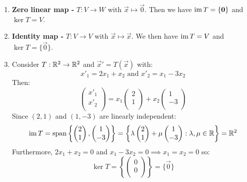 \documentclass[../main.tex]{subfiles}
\begin{document}
\begin{example}
  \begin{enumerate}
    \item \textbf{Zero linear map -} $T: V \to W$ with $\vec{x} \mapsto \vec{0}$.
      Then we have $\operatorname{im} T = \{\mathbf{\bm{0}}\}$ and $\ker T = V$.
    \item \textbf{Identity map -} $T: V \to V$ with $\vec{x} \mapsto \vec{x}$.
      We then have $\operatorname{im} T = V$ and $\ker T = \{\vec{0}\}$.
    \item Consider $T: \mathbb{R}^2 \to \mathbb{R}^2$ and $\vec{x}' = T(\vec{x})$ with:
      \[
        x'_1 = 2x_1 + x_2 \text{ and } x'_2 = x_1 - 3x_2
      \]
      Then:
      \[
        \begin{pmatrix}
        x'_1 \\
        x'_2 \\
        \end{pmatrix} =
        x_1 \begin{pmatrix}
        2 \\
        1 \\
        \end{pmatrix} +
        x_2 \begin{pmatrix}
        1 \\
        -3 \\
        \end{pmatrix}
      \]
      Since $(2, 1)$ and $(1, -3)$ are linearly independent:
      \[
        \operatorname{im} T = \operatorname{span}\left\{
        \begin{pmatrix}
        2 \\
        1 \\
        \end{pmatrix},
        \begin{pmatrix}
        1 \\
        -3 \\
        \end{pmatrix}
        \right\} =
        \left\{
        \lambda\begin{pmatrix}
        2 \\
        1 \\
        \end{pmatrix} +
        \mu\begin{pmatrix}
        1 \\
        -3 \\
        \end{pmatrix}: \lambda, \mu \in \mathbb{R}
        \right\} = \mathbb{R}^2
      \]
      Furthermore, $2x_1 + x_2 = 0$ and $x_1 - 3x_2 = 0 \implies x_1 = x_2 = 0$ so:
      \[
        \ker T = \left\{\begin{pmatrix}
        0 \\
        0 \\
        \end{pmatrix}\right\} = \{\vec{0}\}
      \]
  \end{enumerate}
\end{example}
\end{document}
